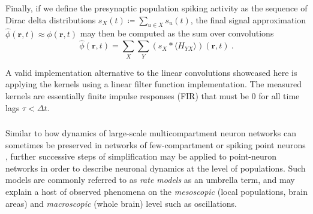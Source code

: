 Finally, if we define the presynaptic population spiking activity as the sequence of Dirac delta distributions $s_X(t) \coloneq \sum_{u \in X} s_u(t)$,
the final signal approximation $\hat{\phi}(\mathbf{r}, t) \approx \phi(\mathbf{r}, t)$ may then be computed as the sum over convolutions
\begin{equation}
\hat{\phi}(\mathbf{r}, t) = \sum_X \sum_Y \left(s_X \ast \langle H_{YX} \rangle \right)(\mathbf{r}, t)~.
\end{equation}

A valid implementation alternative to the linear convolutions showcased here is applying the kernels using a linear filter function implementation.
The measured kernels are essentially finite impulse responses (FIR) that must be 0 for all time lags $\tau < \Delta t$.


\subsubsection{}
\label{sec:Schemes:populationmodels}
Similar to how  dynamics of large-scale multicompartment neuron networks  can sometimes be preserved in  networks of few-compartment or spiking point neurons , further successive steps of simplification may be applied to point-neuron networks in order to describe neuronal dynamics at the level of populations. Such models are commonly referred to as \emph{rate models} as an umbrella term, and may explain a host of observed phenomena on the \emph{mesoscopic} (local populations, brain areas) and \emph{macroscopic} (whole brain) level such as oscillations.


